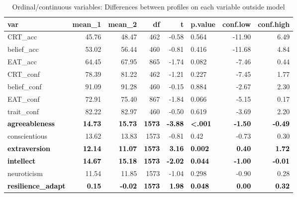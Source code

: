 \documentclass[]{article}
\begin{document}
\begin{table}[H]

\caption{\label{tab:unnamed-chunk-9}Ordinal/continuous variables: Differences between profiles on each variable outside model}
\centering
\fontsize{6}{8}\selectfont
\begin{tabular}[t]{lrrrrlrr}
\toprule
var & mean\_1 & mean\_2 & df & t & p.value & conf.low & conf.high\\
\midrule
CRT\_acc & 45.76 & 48.47 & 462 & -0.58 & 0.564 & -11.90 & 6.49\\
belief\_acc & 53.02 & 56.44 & 460 & -0.81 & 0.416 & -11.68 & 4.84\\
EAT\_acc & 64.45 & 67.95 & 865 & -1.74 & 0.082 & -7.46 & 0.44\\
CRT\_conf & 78.39 & 81.22 & 462 & -1.21 & 0.227 & -7.45 & 1.77\\
belief\_conf & 91.09 & 91.28 & 460 & -0.15 & 0.884 & -2.67 & 2.30\\
\addlinespace
EAT\_conf & 72.91 & 75.40 & 867 & -1.84 & 0.066 & -5.15 & 0.17\\
trait\_conf & 82.22 & 82.97 & 460 & -0.50 & 0.619 & -3.69 & 2.20\\
\textcolor{black}{\textbf{agreeableness}} & \textcolor{black}{\textbf{14.73}} & \textcolor{black}{\textbf{15.73}} & \textcolor{black}{\textbf{1573}} & \textcolor{black}{\textbf{-3.88}} & \textcolor{black}{\textbf{<.001}} & \textcolor{black}{\textbf{-1.50}} & \textcolor{black}{\textbf{-0.49}}\\
conscientious & 13.62 & 13.83 & 1573 & -0.81 & 0.42 & -0.73 & 0.30\\
\textcolor{black}{\textbf{extraversion}} & \textcolor{black}{\textbf{12.14}} & \textcolor{black}{\textbf{11.07}} & \textcolor{black}{\textbf{1573}} & \textcolor{black}{\textbf{3.16}} & \textcolor{black}{\textbf{0.002}} & \textcolor{black}{\textbf{0.40}} & \textcolor{black}{\textbf{1.72}}\\
\addlinespace
\textcolor{black}{\textbf{intellect}} & \textcolor{black}{\textbf{14.67}} & \textcolor{black}{\textbf{15.18}} & \textcolor{black}{\textbf{1573}} & \textcolor{black}{\textbf{-2.02}} & \textcolor{black}{\textbf{0.044}} & \textcolor{black}{\textbf{-1.00}} & \textcolor{black}{\textbf{-0.01}}\\
neuroticism & 11.54 & 11.85 & 1573 & -1.04 & 0.298 & -0.90 & 0.28\\
\textcolor{black}{\textbf{resilience\_adapt}} & \textcolor{black}{\textbf{0.15}} & \textcolor{black}{\textbf{-0.02}} & \textcolor{black}{\textbf{1573}} & \textcolor{black}{\textbf{1.98}} & \textcolor{black}{\textbf{0.048}} & \textcolor{black}{\textbf{0.00}} & \textcolor{black}{\textbf{0.32}}\\

\end{tabular}
\end{table}
\end{document}

